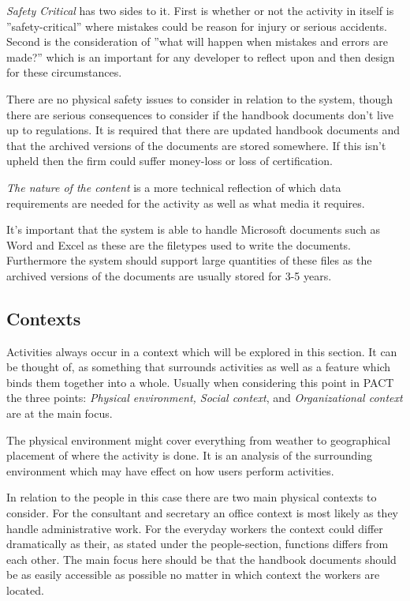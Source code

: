 \textit{Safety Critical} has two sides to it.
First is whether or not the activity in itself is ''safety-critical'' where mistakes could be reason for injury or serious accidents.
Second is the consideration of ''what will happen when mistakes and errors are made?'' which is an important for any developer to reflect upon and then design for these circumstances.
\citep{Benyon}

There are no physical safety issues to consider in relation to the system, though there are serious consequences to consider if the handbook documents don't live up to regulations. 
It is required that there are updated handbook documents and that the archived versions of the documents are stored somewhere. 
If this isn't upheld then the firm could suffer money-loss or loss of certification.

\textit{The nature of the content} is a more technical reflection of which data requirements are needed for the activity as well as what media it requires.
\citep{Benyon}

It's important that the system is able to handle Microsoft documents such as Word and Excel as these are the filetypes used to write the documents.
Furthermore the system should support large quantities of these files as the archived versions of the documents are usually stored for 3-5 years.

\subsection{Contexts}
Activities always occur in a context which will be explored in this section.
It can be thought of, as something that surrounds activities as well as a feature which binds them together into a whole.
Usually when considering this point in PACT the three points: \textit{Physical environment, Social context}, and \textit{Organizational context} are at the main focus.
\citep{Benyon}

The physical environment might cover everything from weather to geographical placement of where the activity is done. 
It is an analysis of the surrounding environment which may have effect on how users perform activities.
\citep{Benyon}

In relation to the people in this case there are two main physical contexts to consider. 
For the consultant and secretary an office context is most likely as they handle administrative work. 
For the everyday workers the context could differ dramatically as their, as stated under the people-section, functions differs from each other.
The main focus here should be that the handbook documents should be as easily accessible as possible no matter in which context the workers are located.

